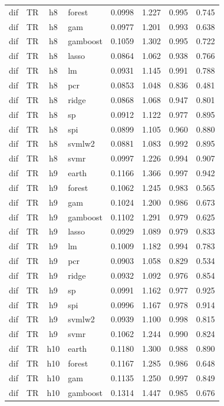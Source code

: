 \begin{ThreePartTable}
\begin{longtable}[t]{llclcccc}
dif & TR & h8 & forest & 0.0998 & 1.227 & 0.995 & 0.745\\
dif & TR & h8 & gam & 0.0977 & 1.201 & 0.993 & 0.638\\
dif & TR & h8 & gamboost & 0.1059 & 1.302 & 0.995 & 0.722\\
dif & TR & h8 & lasso & 0.0864 & 1.062 & 0.938 & 0.766\\
dif & TR & h8 & lm & 0.0931 & 1.145 & 0.991 & 0.788\\
dif & TR & h8 & pcr & 0.0853 & 1.048 & 0.836 & 0.481\\
dif & TR & h8 & ridge & 0.0868 & 1.068 & 0.947 & 0.801\\
dif & TR & h8 & sp & 0.0912 & 1.122 & 0.977 & 0.895\\
dif & TR & h8 & spi & 0.0899 & 1.105 & 0.960 & 0.880\\
dif & TR & h8 & svmlw2 & 0.0881 & 1.083 & 0.992 & 0.895\\
dif & TR & h8 & svmr & 0.0997 & 1.226 & 0.994 & 0.907\\
\addlinespace
dif & TR & h9 & earth & 0.1166 & 1.366 & 0.997 & 0.942\\
dif & TR & h9 & forest & 0.1062 & 1.245 & 0.983 & 0.565\\
dif & TR & h9 & gam & 0.1024 & 1.200 & 0.986 & 0.673\\
dif & TR & h9 & gamboost & 0.1102 & 1.291 & 0.979 & 0.625\\
dif & TR & h9 & lasso & 0.0929 & 1.089 & 0.979 & 0.833\\
dif & TR & h9 & lm & 0.1009 & 1.182 & 0.994 & 0.783\\
dif & TR & h9 & pcr & 0.0903 & 1.058 & 0.829 & 0.534\\
dif & TR & h9 & ridge & 0.0932 & 1.092 & 0.976 & 0.854\\
dif & TR & h9 & sp & 0.0991 & 1.162 & 0.977 & 0.925\\
dif & TR & h9 & spi & 0.0996 & 1.167 & 0.978 & 0.914\\
dif & TR & h9 & svmlw2 & 0.0939 & 1.100 & 0.998 & 0.815\\
dif & TR & h9 & svmr & 0.1062 & 1.244 & 0.990 & 0.824\\
\addlinespace
dif & TR & h10 & earth & 0.1180 & 1.300 & 0.988 & 0.890\\
dif & TR & h10 & forest & 0.1167 & 1.285 & 0.986 & 0.648\\
dif & TR & h10 & gam & 0.1135 & 1.250 & 0.997 & 0.849\\
dif & TR & h10 & gamboost & 0.1314 & 1.447 & 0.985 & 0.676\\

\end{longtable}
\end{ThreePartTable}
